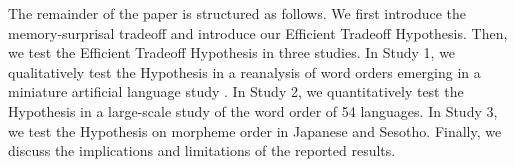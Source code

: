 
The remainder of the paper is structured as follows. We first introduce the memory-surprisal tradeoff and introduce our Efficient Tradeoff Hypothesis. Then, we test the Efficient Tradeoff Hypothesis in three studies. In Study 1, we qualitatively test the Hypothesis in a reanalysis of word orders emerging in a miniature artificial language study \citep{fedzechkina-human-2017}.
In Study 2, we quantitatively test the Hypothesis in a large-scale study of the word order of 54 languages.
In Study 3, we test the Hypothesis on morpheme order in Japanese and Sesotho.
Finally, we discuss the implications and limitations of the reported results.

%





